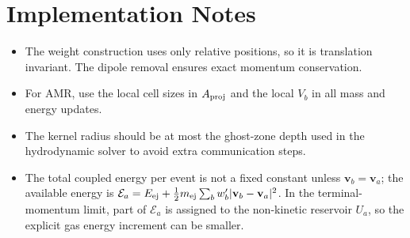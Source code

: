 \documentclass[11pt]{article}
\begin{document}
\section{Implementation Notes}
\begin{itemize}
\item The weight construction uses only relative positions, so it is translation
invariant. The dipole removal ensures exact momentum conservation.
\item For AMR, use the local cell sizes in $A_{\rm proj}$ and the local $V_{b}$ in
all mass and energy updates.
\item The kernel radius should be at most the ghost-zone depth used in the
hydrodynamic solver to avoid extra communication steps.
\item The total coupled energy per event is not a fixed constant unless
$\mathbf v_{b}=\mathbf v_{a}$; the available energy is
$\mathcal E_{a}=E_{\rm ej}+\tfrac{1}{2}m_{\rm ej}\sum_{b}w^{\prime}_{b}|\mathbf v_{b}-\mathbf v_{a}|^{2}$.
In the terminal-momentum limit, part of $\mathcal E_{a}$ is assigned to the
non-kinetic reservoir $U_{a}$, so the explicit gas energy increment can be smaller.
\end{itemize}
\end{document}
